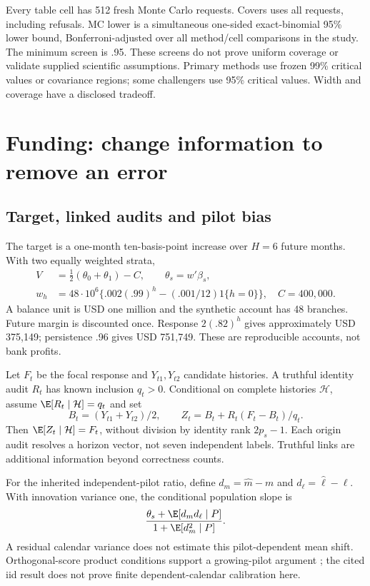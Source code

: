 Every table cell has 512 fresh Monte Carlo requests. Covers uses all requests, including refusals. MC lower is a simultaneous one-sided exact-binomial 95\% lower bound, Bonferroni-adjusted over all method/cell comparisons in the study. The minimum screen is .95. These screens do not prove uniform coverage or validate supplied scientific assumptions. Primary methods use frozen 99\% critical values or covariance regions; some challengers use 95\% critical values. Width and coverage have a disclosed tradeoff.

\section{Funding: change information to remove an error}
\subsection{Target, linked audits and pilot bias}
The target is a one-month ten-basis-point increase over $H=6$ future months. With two equally weighted strata,
\[
 \begin{aligned}
 V&=\tfrac12(\theta_0+\theta_1)-C,\qquad \theta_s=w'\beta_s,\\
 w_h&=48\cdot10^6\{.002(.99)^h-(.001/12)1\{h=0\}\},\quad C=400{,}000.
\end{aligned}
\]
A balance unit is USD one million and the synthetic account has 48 branches. Future margin is discounted once. Response $2(.82)^h$ gives approximately USD 375,149; persistence .96 gives USD 751,749. These are reproducible accounts, not bank profits.

Let $F_t$ be the focal response and $Y_{t1},Y_{t2}$ candidate histories. A truthful identity audit $R_t$ has known inclusion $q_t>0$. Conditional on complete histories $\mathcal H$, assume $\E[R_t\mid\mathcal H]=q_t$ and set
\[
 B_t=(Y_{t1}+Y_{t2})/2,\qquad Z_t=B_t+R_t(F_t-B_t)/q_t.
\]
Then $\E[Z_t\mid\mathcal H]=F_t$, without division by identity rank $2p_s-1$. Each origin audit resolves a horizon vector, not seven independent labels. Truthful links are additional information beyond correctness counts.

For the inherited independent-pilot ratio, define $d_m=\widehat m-m$ and $d_\ell=\widehat\ell-\ell$. With innovation variance one, the conditional population slope is
\[
 \frac{\theta_s+\E[d_md_\ell\mid P]}{1+\E[d_m^2\mid P]}.
\]
A residual calendar variance does not estimate this pilot-dependent mean shift. Orthogonal-score product conditions support a growing-pilot argument \citep{dml2018}; the cited iid result does not prove finite dependent-calendar calibration here.

